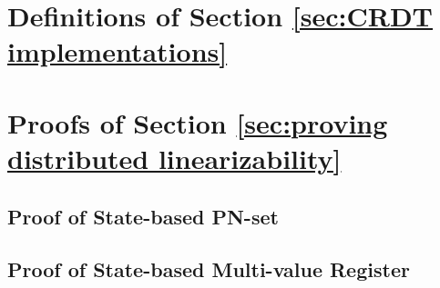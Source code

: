 \section{Definitions of Section \ref{sec:CRDT implementations}}
\label{sec:appendix definitions of section CRDT implementations}








\section{Proofs of Section \ref{sec:proving distributed linearizability}}
\label{sec:appendix proofs of section proving distributed linearizability} 









\subsection{Proof of State-based PN-set}
\label{subsec:appendix proof of state-based PN-set} 

 
\subsection{Proof of State-based Multi-value Register}
\label{subsec:appendix proof of state-based multi-value register} 